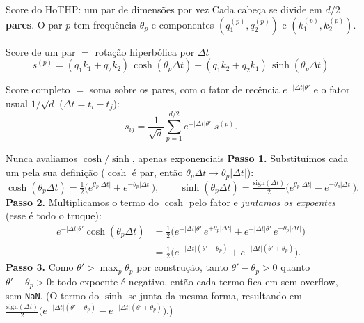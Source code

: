\documentclass[aspectratio=169,9pt]{beamer}
\begin{document}
\begin{frame}{Score do HoTHP: um par de dimensões por vez}
  Cada cabeça se divide em $d/2$ \textbf{pares}. O par $p$ tem frequência
  $\theta_p$ e componentes $(q_1^{(p)}, q_2^{(p)})$ e $(k_1^{(p)}, k_2^{(p)})$.
  \vspace{0.3em}
  \begin{block}{Score de um par $=$ rotação hiperbólica por $\Delta t$}
    \[
      s^{(p)} = (q_1 k_1 + q_2 k_2)\,\cosh(\theta_p \Delta t)
              + (q_1 k_2 + q_2 k_1)\,\sinh(\theta_p \Delta t)
    \]
  \end{block}
  Score completo $=$ soma sobre os pares, com o fator de recência
  $e^{-|\Delta t|\theta'}$ e o fator usual $1/\sqrt{d}$ ($\Delta t = t_i - t_j$):
  \[
    s_{ij} = \frac{1}{\sqrt{d}} \sum_{p=1}^{d/2}
      e^{-|\Delta t|\theta'}\; s^{(p)} .
  \]

\end{frame}

\begin{frame}{Nunca avaliamos $\cosh/\sinh$, apenas exponenciais}
  \textbf{Passo 1.} Substituímos cada um pela sua definição ($\cosh$ é par, então
  $\theta_p\Delta t \to \theta_p|\Delta t|$):
  \[
    \cosh(\theta_p \Delta t) = \tfrac{1}{2}\big(e^{\theta_p|\Delta t|} + e^{-\theta_p|\Delta t|}\big),
    \qquad
    \sinh(\theta_p \Delta t) = \tfrac{\mathrm{sign}(\Delta t)}{2}\big(e^{\theta_p|\Delta t|} - e^{-\theta_p|\Delta t|}\big).
  \]
  \textbf{Passo 2.} Multiplicamos o termo do $\cosh$ pelo fator e \emph{juntamos
  os expoentes} (esse é todo o truque):
  \begin{align*}
    e^{-|\Delta t|\theta'}\cosh(\theta_p \Delta t)
      &= \tfrac{1}{2}\Big(
          e^{-|\Delta t|\theta'}\, e^{+\theta_p|\Delta t|}
        + e^{-|\Delta t|\theta'}\, e^{-\theta_p|\Delta t|}\Big) \\[0.3em]
      &= \tfrac{1}{2}\Big(
          e^{-|\Delta t|(\theta' - \theta_p)}
        + e^{-|\Delta t|(\theta' + \theta_p)}\Big).
  \end{align*}
  \textbf{Passo 3.} Como $\theta' > \max_p \theta_p$ por construção, tanto
  $\theta'-\theta_p>0$ quanto $\theta'+\theta_p>0$: \alert{todo expoente é
  negativo}, então cada termo fica em sem overflow, sem \texttt{NaN}.
  \vspace{0.2em}
  {\small (O termo do $\sinh$ se junta da mesma forma, resultando em
  $\tfrac{\mathrm{sign}(\Delta t)}{2}\big(e^{-|\Delta t|(\theta'-\theta_p)} - e^{-|\Delta t|(\theta'+\theta_p)}\big)$.)}
\end{frame}
\end{document}

